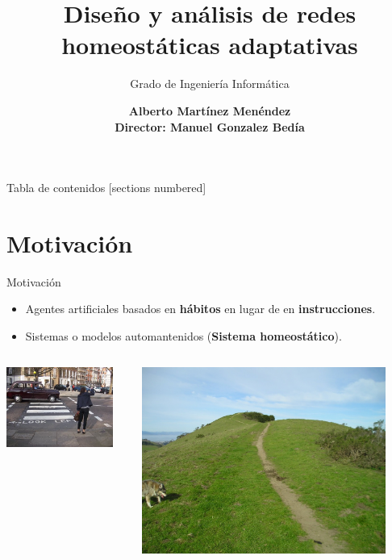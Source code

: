 \documentclass[aspectratio=169]{beamer}
\title{Diseño y análisis de redes homeostáticas adaptativas}
\subtitle{Grado de Ingeniería Informática}
\date{}
\author[Alberto Martínez Menéndez]{\textbf {Alberto Martínez Menéndez\\ \footnotesize Director: Manuel Gonzalez Bedía}}
\institute{Escuela de Ingeniería y Arquitectura}
\begin{document}
\maketitle

\begin{frame}{Tabla de contenidos}
  [sections numbered]
  \tableofcontents[hideallsubsections]
\end{frame}

\section{Motivación}
\begin{frame}{Motivación}
\begin{itemize}
  \item {Agentes artificiales basados en \textbf{hábitos} en lugar de en \textbf{instrucciones}.}
  \item {Sistemas o modelos automantenidos (\textbf{Sistema homeostático}).}
\end{itemize}
  \vspace{1cm}
  \begin{columns}
    \begin{column}{0.47\textwidth}
      \includegraphics[width=0.9\textwidth,height=.5\textheight]{Imagenes/MirarCalle}
    \end{column}
    \begin{column}{0.5\textwidth}
      \includegraphics[width=0.9\textwidth,height=.5\textheight]{Imagenes/Camino}

\end{column}
\end{columns}
\end{frame}
\end{document}
